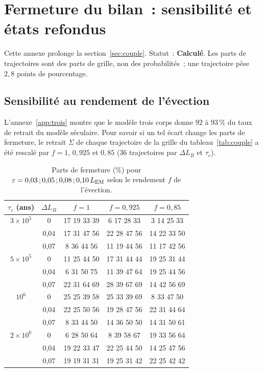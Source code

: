 \documentclass[11pt,a4paper]{article}
\newcommand{\LEM}{\ensuremath{L_{\rm EM}}}
\newcommand{\stCalc}{\textcolor{vert}{\textbf{Calculé}}}
\begin{document}
\section{Fermeture du bilan~: sensibilité et états refondus}
\label{app:ferm}

Cette annexe prolonge la section~\ref{sec:couple}. Statut~: \stCalc. Les parts de trajectoires sont des parts de grille, non des probabilités~; une trajectoire pèse $2{,}8$ points de pourcentage.

\subsection{Sensibilité au rendement de l'évection}

L'annexe~\ref{app:trois} montre que le modèle trois corps donne $92$ à $93\,\%$ du taux de retrait du modèle séculaire. Pour savoir si un tel écart change les parts de fermeture, le retrait $\Sigma$ de chaque trajectoire de la grille du tableau~\ref{tab:couple} a été rescalé par $f=1$, $0{,}925$ et $0{,}85$ (36 trajectoires par $\Delta L_B$ et $\tau_c$).

\begin{table}[htbp]
\centering\footnotesize\setlength{\tabcolsep}{4pt}
\caption{Parts de fermeture (\%) pour $\varepsilon=0{,}03\,;0{,}05\,;0{,}08\,;0{,}10\,\LEM$ selon le rendement $f$ de l'évection.\label{tab:sensib}}
\begin{tabular}{ccccc}\toprule
$\tau_c$ (ans) & $\Delta L_B$ & $f=1$ & $f=0{,}925$ & $f=0{,}85$ \\\midrule
$3\times10^5$ & 0 & 17 19 33 39 & 6 17 28 33 & 3 14 25 33\\
 & 0,04 & 17 31 47 56 & 22 28 47 56 & 14 22 33 50\\
 & 0,07 & 8 36 44 56 & 11 19 44 56 & 11 17 42 56\\\midrule
$5\times10^5$ & 0 & 11 25 44 50 & 17 31 44 44 & 19 25 31 44\\
 & 0,04 & 6 31 50 75 & 11 39 47 64 & 19 25 44 56\\
 & 0,07 & 22 31 64 69 & 28 39 67 69 & 14 42 56 69\\\midrule
$10^6$ & 0 & 25 25 39 58 & 25 33 39 69 & 8 33 47 50\\
 & 0,04 & 22 25 50 56 & 19 28 47 56 & 22 31 44 64\\
 & 0,07 & 8 33 44 50 & 14 36 50 50 & 14 31 50 61\\\midrule
$2\times10^6$ & 0 & 6 28 50 64 & 8 39 58 67 & 19 33 56 64\\
 & 0,04 & 19 22 33 47 & 22 25 44 50 & 14 25 47 56\\
 & 0,07 & 19 19 31 31 & 19 25 31 42 & 22 25 42 42\\\bottomrule
\end{tabular}
\end{table}
\end{document}
